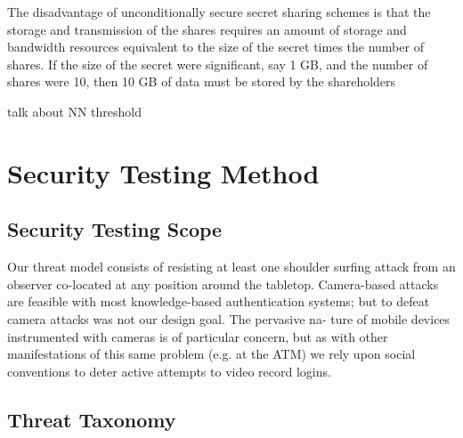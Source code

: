 The disadvantage of unconditionally secure secret sharing schemes is that the storage and transmission of the shares requires an amount of storage and bandwidth resources equivalent to the size of the secret times the number of shares. If the size of the secret were significant, say 1 GB, and the number of shares were 10, then 10 GB of data must be stored by the shareholders

talk about NN threshold

\section{Security Testing Method}

\subsection{Security Testing Scope}

Our threat model consists of resisting at least one shoulder surfing attack from an observer co-located at any position around the tabletop. Camera-based attacks are feasible with most knowledge-based authentication systems; but to defeat camera attacks was not our design goal. The pervasive na- ture of mobile devices instrumented with cameras is of particular concern, but as with other manifestations of this same problem (e.g. at the ATM) we rely upon social conventions to deter active attempts to video record logins.

\subsection{Threat Taxonomy}
